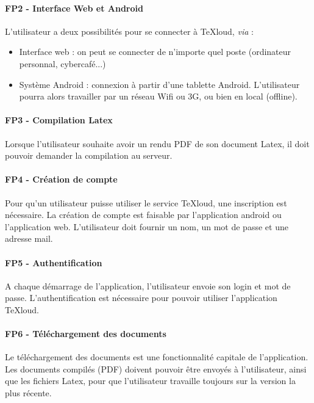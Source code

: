 \documentclass[a4paper,12pt]{article}
\begin{document}
\paragraph{FP2 - Interface Web et Android\\}
L'utilisateur a deux possibilités pour se connecter à TeXloud, \emph{via} :\\
\begin{itemize}
 \item Interface web : on peut se connecter de n'importe quel poste (ordinateur personnal, cybercafé...)
 \item Système Android : connexion à partir d'une tablette Android. L'utilisateur pourra alors 
travailler par un réseau Wifi ou 3G, ou bien en local (offline).
\end{itemize}

\paragraph{FP3 - Compilation Latex\\}
Lorsque l'utilisateur souhaite avoir un rendu PDF de son document Latex, il doit pouvoir demander 
la compilation au serveur.

\paragraph{FP4 - Création de compte\\}
Pour qu'un utilisateur puisse utiliser le service TeXloud, une inscription est nécessaire. La 
création de compte est faisable par l'application android ou l'application web. L'utilisateur doit
fournir un nom, un mot de passe et une adresse mail.

\paragraph{FP5 - Authentification\\}
A chaque démarrage de l'application, l'utilisateur envoie son login et mot de passe. L'authentification
est nécessaire pour pouvoir utiliser l'application TeXloud.

\paragraph{FP6 - Téléchargement des documents\\}
Le téléchargement des documents est une fonctionnalité capitale de l'application. Les documents 
compilés (PDF) doivent pouvoir être envoyés à l'utilisateur, ainsi que les fichiers Latex, pour que 
l'utilisateur travaille toujours sur la version la plus récente.
\end{document}
